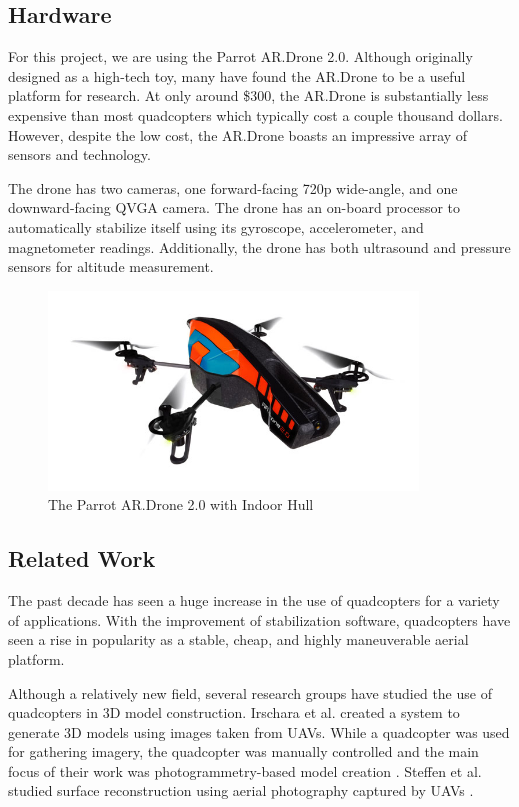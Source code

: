 \documentclass[pageno]{jpaper}
\begin{document}
\subsection{Hardware}
For this project, we are using the Parrot AR.Drone 2.0. Although originally designed as a high-tech toy, many have found the AR.Drone to be a useful platform for research. At only around \$300, the AR.Drone is substantially less expensive than most quadcopters which typically cost a couple thousand dollars. However, despite the low cost, the AR.Drone boasts an impressive array of sensors and technology.

The drone has two cameras, one forward-facing 720p wide-angle, and one downward-facing QVGA camera. The drone has an on-board processor to automatically stabilize itself using its gyroscope, accelerometer, and magnetometer readings. Additionally, the drone has both ultrasound and pressure sensors for altitude measurement.

\begin{figure}
\centering
\includegraphics[height=200px]{../images/drone_in.jpg}
\caption{The Parrot AR.Drone 2.0 with Indoor Hull}
\end{figure}

\subsection{Related Work}

The past decade has seen a huge increase in the use of quadcopters for a variety of applications. With the improvement of stabilization software, quadcopters have seen a rise in popularity as a stable, cheap, and highly maneuverable aerial platform. 

Although a relatively new field, several research groups have studied the use of quadcopters in 3D model construction. Irschara et al. created a system to generate 3D models using images taken from UAVs. While a quadcopter was used for gathering imagery, the quadcopter was manually controlled and the main focus of their work was photogrammetry-based model creation \cite{Irschara}. Steffen et al. studied surface reconstruction using aerial photography captured by UAVs \cite{Steffen}.
\end{document}
